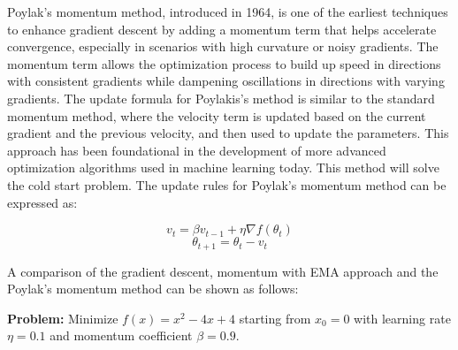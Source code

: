 \documentclass[
  letterpaper,
  DIV=11,
  numbers=noendperiod]{scrreprt}
\begin{document}
\begin{tcolorbox}[enhanced jigsaw, leftrule=.75mm, rightrule=.15mm, colback=white, colbacktitle=quarto-callout-tip-color!10!white, arc=.35mm, opacityback=0, toptitle=1mm, bottomrule=.15mm, bottomtitle=1mm, titlerule=0mm, title=\textcolor{quarto-callout-tip-color}{\faLightbulb}\hspace{0.5em}{Poylak's Momentum Method:}, toprule=.15mm, left=2mm, coltitle=black, breakable, colframe=quarto-callout-tip-color-frame, opacitybacktitle=0.6]

Poylak's momentum method, introduced in 1964, is one of the earliest
techniques to enhance gradient descent by adding a momentum term that
helps accelerate convergence, especially in scenarios with high
curvature or noisy gradients. The momentum term allows the optimization
process to build up speed in directions with consistent gradients while
dampening oscillations in directions with varying gradients. The update
formula for Poylakis's method is similar to the standard momentum
method, where the velocity term is updated based on the current gradient
and the previous velocity, and then used to update the parameters. This
approach has been foundational in the development of more advanced
optimization algorithms used in machine learning today. This method will
solve the cold start problem. The update rules for Poylak's momentum
method can be expressed as:

\[v_t = \beta v_{t-1} +\eta  \nabla f(\theta_t)\]
\[\theta_{t+1} = \theta_t - v_t\]

\end{tcolorbox}

A comparison of the gradient descent, momentum with EMA approach and the
Poylak's momentum method can be shown as follows:

\textbf{Problem:} Minimize \(f(x) = x^2 - 4x + 4\) starting from
\(x_0 = 0\) with learning rate \(\eta = 0.1\) and momentum coefficient
\(\beta = 0.9\).
\end{document}
